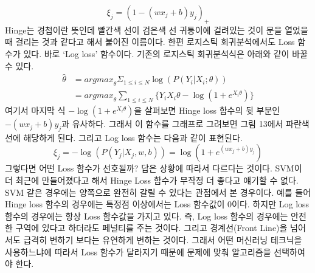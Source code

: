 \documentclass[a4paper]{oblivoir}
\begin{document}
\begin{equation}
\xi_j=(1-(wx_j+b)y_j)_{+}
\label{eq:5-16}
\end{equation}
Hinge는 경첩이란 뜻인데 빨간색 선이 검은색 선 귀퉁이에 걸려있는 것이 문을 열었을 때 걸리는 것과 같다고 해서 붙어진 이름이다. 한편 로지스틱 회귀분석에서도 Loss 함수가 있다. 바로 `Log loss' 함수이다. 기존의 로지스틱 회귀분석식은 아래와 같이 바꿀 수 있다.
\begin{equation}
\begin{split}
\hat{\theta}&={argmax}_{\theta}\Sigma_{1\leq i\leq N} \log(P(Y_i|X_i;\theta))\\
&={argmax}_{\theta} \sum_{1\leq i\leq N}\{Y_i X_i \theta - \log(1+e^{X_i \theta})\}
\end{split}
\end{equation}
\indent 여기서 마지막 식 $- \log(1+e^{X_i \theta})$을 살펴보면 Hinge loss 함수의 뒷 부분인 $-(wx_j+b)y_j$과 유사하다. 그래서 이 함수를 그래프로 그려보면 그림 13에서 파란색 선에 해당하게 된다. 그리고 Log loss 함수는 다음과 같이 표현된다.
\begin{equation}
\xi_j=-\log(P(Y_j|X_j,w,b))=\log(1+e^{(wx_j+b)y_j})
\label{eq:5-17}
\end{equation}
\indent 그렇다면 어떤 Loss 함수가 선호될까? 답은 상황에 따라서 다르다는 것이다. SVM이 더 최근에 만들어졌다고 해서 Hinge Loss 함수가 무작정 더 좋다고 얘기할 수 없다. SVM 같은 경우에는 양쪽으로 완전히 갈릴 수 있다는 관점에서 본 경우이다. 예를 들어 Hinge loss 함수의 경우에는 특정점 이상에서는 Loss 함수값이 0이다. 하지만 Log loss 함수의 경우에는 항상 Loss 함수값을 가지고 있다. 즉, Log loss 함수의 경우에는 안전한 구역에 있다고 하더라도 페널티를 주는 것이다. 그리고 경계선(Front Line)을 넘어서도 급격히 변하기 보다는 유연하게 변하는 것이다. 그래서 어떤 머신러닝 테크닉을 사용하느냐에 따라서 Loss 함수가 달라지기 때문에 문제에 맞춰 알고리즘을 선택하여야 한다.\\

\end{document}
